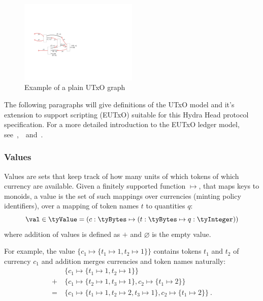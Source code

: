 \begin{figure}[h]
	\centering
        \includegraphics[width=0.5\textwidth]{Hydra/Protocol/Figures/utxo-graph.pdf}
	\caption{Example of a plain UTxO graph}\label{fig:utxo-graph}
\end{figure}

The following paragraphs will give definitions of the UTxO model and it's
extension to support scripting (EUTxO) suitable for this Hydra Head protocol
specification. For a more detailed introduction to the EUTxO ledger model,
see~\cite{eutxo},~\cite{eutxo-2}~and~\cite{utxo-ma}.

\subsubsection{Values}

\begin{definition}[Values]
	Values are sets that keep track of how many units of which tokens of which
	currency are available. Given a finitely supported function $\mapsto$, that
	maps keys to monoids, a value is the set of such mappings over currencies
	(minting policy identifiers), over a mapping of token names $t$ to
	quantities $q$:
	\[
		\val \in \tyValue = (c : \tyBytes \mapsto (t : \tyBytes \mapsto q : \tyInteger))
	\]
	\noindent where addition of values is defined as $+$ and $\varnothing$ is the empty value.
\end{definition}

For example, the value $\{c_{1} \mapsto \{t_1 \mapsto 1, t_2 \mapsto 1\}\}$
contains tokens $t_1$ and $t_2$ of currency $c_{1}$ and addition merges
currencies and token names naturally:
\begin{align*}
	     & \{c_{1} \mapsto \{t_1 \mapsto 1, t_2 \mapsto 1\}\}                                                        \\
	+ \  & \{c_{1} \mapsto \{t_{2} \mapsto 1, t_3 \mapsto 1\}, c_{2} \mapsto \{ t_{1} \mapsto 2\}\}                  \\
	= \  & \{c_{1} \mapsto \{t_1 \mapsto 1, t_2 \mapsto 2, t_3 \mapsto 1\}, c_{2} \mapsto \{ t_{1} \mapsto 2\}\} \ .
\end{align*}

